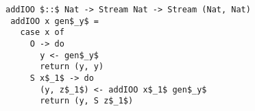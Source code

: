 \begin{figure}[!t]
  \centering
  \begin{minipage}{0.59\columnwidth}
    \begin{lstlisting}[frame=tb]
 addIOO $::$ Nat -> Stream Nat -> Stream (Nat, Nat)
 addIOO x gen$_y$ =
   case x of
     O -> do
       y <- gen$_y$
       return (y, y)
     S x$_1$ -> do
       (y, z$_1$) <- addIOO x$_1$ gen$_y$
       return (y, S z$_1$)
    \end{lstlisting}
  \end{minipage}
\end{figure}
